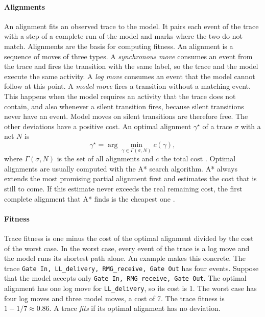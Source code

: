 \paragraph{Alignments}
\label{sec:astar_alignment_definition}
An alignment fits an observed trace to the model. It pairs each event of the
trace with a step of a complete run of the model and marks where the two do not
match. Alignments are the basis for computing fitness. An alignment is a
sequence of moves of three types. A \emph{synchronous move} consumes an event
from the trace and fires the transition with the same label, so the trace and
the model execute the same activity. A \emph{log move}
consumes an event that the model cannot follow at this point. A \emph{model
move} fires a transition without a matching event. This happens when the model
requires an activity that the trace does not contain, and also whenever a
silent transition fires, because silent transitions never have an event. Model
moves on silent transitions are therefore free. The other deviations have a
positive cost. An optimal alignment $\gamma^{\star}$ of a trace $\sigma$ with a
net $N$ is
\begin{equation}
\gamma^{\star}=\arg\min_{\gamma\in\Gamma(\sigma,N)} c(\gamma),
\end{equation}
where $\Gamma(\sigma,N)$ is the set of all alignments and $c$ the total cost
\cite{aalst2012ConformanceChecking,Adriansyah2011CostFitness}. Optimal
alignments are usually computed with the A* search algorithm. A* always extends
the most promising partial alignment first and estimates the cost that is still
to come. If this estimate never exceeds the real remaining cost, the first
complete alignment that A* finds is the cheapest one
\cite{Adriansyah2011CostFitness}.

\paragraph{Fitness}
Trace fitness is one minus the cost of the optimal alignment divided by the
cost of the worst case. In the worst case, every event of the trace is a log
move and the model runs its shortest path alone. An example makes this concrete.
The trace \texttt{Gate In, LL\_delivery, RMG\_receive, Gate Out} has four events.
Suppose that the model accepts only \texttt{Gate In, RMG\_receive, Gate Out}. The
optimal alignment has one log move for \texttt{LL\_delivery}, so its cost is 1.
The worst case has four log moves and three model moves, a cost of 7. The trace
fitness is $1-1/7\approx 0.86$. A trace \emph{fits} if its optimal alignment has
no deviation.

